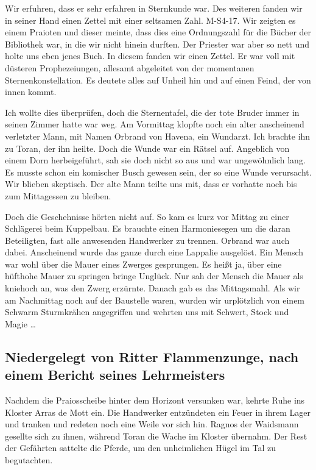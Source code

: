 Wir erfuhren, dass er sehr erfahren in Sternkunde war. Des weiteren fanden wir in seiner Hand einen Zettel mit einer seltsamen Zahl. M-S4-17. Wir zeigten es einem Praioten und dieser meinte, dass dies eine Ordnungszahl für die Bücher der Bibliothek war, in die wir nicht hinein durften. Der Priester war aber so nett und holte uns eben jenes Buch. In diesem fanden wir einen Zettel. Er war voll mit düsteren Prophezeiungen, allesamt abgeleitet von der momentanen Sternenkonstellation. Es deutete alles auf Unheil hin und auf einen Feind, der von innen kommt.


Ich wollte dies überprüfen, doch die Sternentafel, die der tote Bruder immer in seinen Zimmer hatte war weg. Am Vormittag klopfte noch ein alter anscheinend verletzter Mann, mit Namen Orbrand von Havena, ein Wundarzt. Ich brachte ihn zu Toran, der ihn heilte. Doch die Wunde war ein Rätsel auf. Angeblich von einem Dorn herbeigeführt, sah sie doch nicht so aus und war ungewöhnlich lang. Es musste schon ein komischer Busch gewesen sein, der so eine Wunde verursacht. Wir blieben skeptisch. Der alte Mann teilte uns mit, dass er vorhatte noch bis zum Mittagessen zu bleiben. 


Doch die Geschehnisse hörten nicht auf. So kam es kurz vor Mittag zu einer Schlägerei beim Kuppelbau. Es brauchte einen Harmoniesegen um die daran Beteiligten, fast alle anwesenden Handwerker zu trennen. Orbrand war auch dabei. Anscheinend wurde das ganze durch eine Lappalie ausgelöst. Ein Mensch war wohl über die Mauer eines Zwerges gesprungen. Es heißt ja, über eine hüfthohe Mauer zu springen bringe Unglück. Nur sah der Mensch die Mauer als kniehoch an, was den Zwerg erzürnte. Danach gab es das Mittagsmahl. Als wir am Nachmittag noch auf der Baustelle waren, wurden wir urplötzlich von einem Schwarm Sturmkrähen angegriffen und wehrten uns mit Schwert, Stock und Magie \dots

\subsection{Niedergelegt von Ritter Flammenzunge, nach einem Bericht seines Lehrmeisters}

Nachdem die Praiosscheibe hinter dem Horizont versunken war, kehrte Ruhe ins Kloster Arras de Mott ein. Die Handwerker entzündeten ein Feuer in ihrem Lager und tranken und redeten noch eine Weile vor sich hin. Ragnos der Waidsmann gesellte sich zu ihnen, während Toran die Wache im Kloster übernahm. Der Rest der Gefährten sattelte die Pferde, um den unheimlichen Hügel im Tal zu begutachten.

